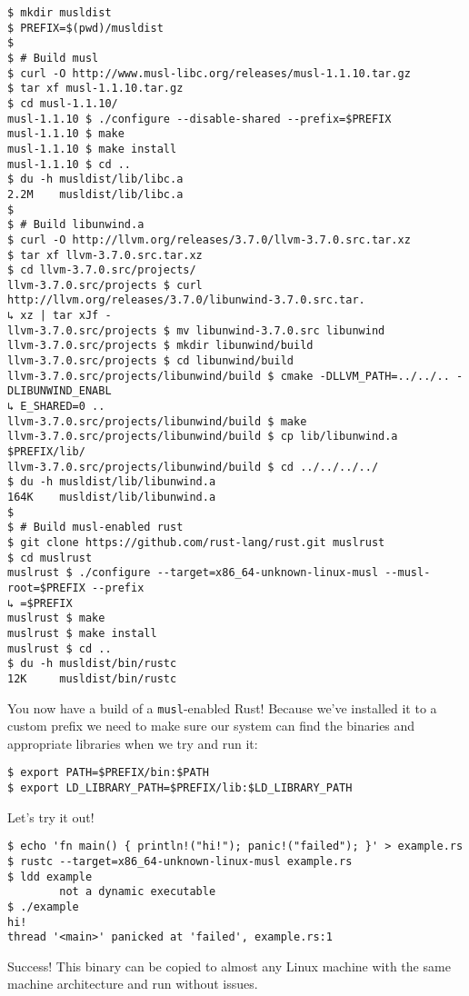 \documentclass[a4paper,]{book}
\begin{document}
\begin{verbatim}
$ mkdir musldist
$ PREFIX=$(pwd)/musldist
$
$ # Build musl
$ curl -O http://www.musl-libc.org/releases/musl-1.1.10.tar.gz
$ tar xf musl-1.1.10.tar.gz
$ cd musl-1.1.10/
musl-1.1.10 $ ./configure --disable-shared --prefix=$PREFIX
musl-1.1.10 $ make
musl-1.1.10 $ make install
musl-1.1.10 $ cd ..
$ du -h musldist/lib/libc.a
2.2M    musldist/lib/libc.a
$
$ # Build libunwind.a
$ curl -O http://llvm.org/releases/3.7.0/llvm-3.7.0.src.tar.xz
$ tar xf llvm-3.7.0.src.tar.xz
$ cd llvm-3.7.0.src/projects/
llvm-3.7.0.src/projects $ curl http://llvm.org/releases/3.7.0/libunwind-3.7.0.src.tar.
↳ xz | tar xJf -
llvm-3.7.0.src/projects $ mv libunwind-3.7.0.src libunwind
llvm-3.7.0.src/projects $ mkdir libunwind/build
llvm-3.7.0.src/projects $ cd libunwind/build
llvm-3.7.0.src/projects/libunwind/build $ cmake -DLLVM_PATH=../../.. -DLIBUNWIND_ENABL
↳ E_SHARED=0 ..
llvm-3.7.0.src/projects/libunwind/build $ make
llvm-3.7.0.src/projects/libunwind/build $ cp lib/libunwind.a $PREFIX/lib/
llvm-3.7.0.src/projects/libunwind/build $ cd ../../../../
$ du -h musldist/lib/libunwind.a
164K    musldist/lib/libunwind.a
$
$ # Build musl-enabled rust
$ git clone https://github.com/rust-lang/rust.git muslrust
$ cd muslrust
muslrust $ ./configure --target=x86_64-unknown-linux-musl --musl-root=$PREFIX --prefix
↳ =$PREFIX
muslrust $ make
muslrust $ make install
muslrust $ cd ..
$ du -h musldist/bin/rustc
12K     musldist/bin/rustc
\end{verbatim}

You now have a build of a \texttt{musl}-enabled Rust! Because we've
installed it to a custom prefix we need to make sure our system can find
the binaries and appropriate libraries when we try and run it:

\begin{verbatim}
$ export PATH=$PREFIX/bin:$PATH
$ export LD_LIBRARY_PATH=$PREFIX/lib:$LD_LIBRARY_PATH
\end{verbatim}

Let's try it out!

\begin{verbatim}
$ echo 'fn main() { println!("hi!"); panic!("failed"); }' > example.rs
$ rustc --target=x86_64-unknown-linux-musl example.rs
$ ldd example
        not a dynamic executable
$ ./example
hi!
thread '<main>' panicked at 'failed', example.rs:1
\end{verbatim}

Success! This binary can be copied to almost any Linux machine with the
same machine architecture and run without issues.
\end{document}

